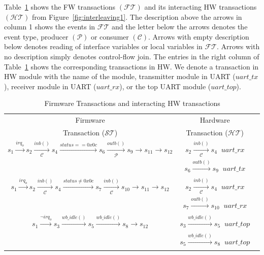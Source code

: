 \documentclass[sigconf]{acmart}
\begin{document}
Table~\ref{transaction} shows the FW transactions $(\mathcal{FT})$ and its 
interacting HW transactions $(\mathcal{HT})$ from Figure~\ref{fig:interleaving1}. 
The description above the arrows 
in column 1 shows the events in $\mathcal{FT}$ and the letter below the
arrows denotes the event type, producer $(\mathcal{P})$ or consumer 
$(\mathcal{C})$. Arrows with empty description below denotes reading of interface
variables or local variables in $\mathcal{FT}$.  Arrows with no description
simply denotes control-flow join.  The entries in the right column of
Table~\ref{transaction} shows the corresponding transactions in HW.  We 
denote a transaction in HW module with the name of the module,
transmitter module in UART ($uart\_tx$), receiver module in UART ($uart\_rx$), or
the top UART module ($uart\_top$).
%
\begin{table}
\begin{center}
{
 \scriptsize
\begin{tabular}{|c|c|c|}
\hline
  Firmware & Hardware  \\
  Transaction ($\mathcal{ST}$) & Transaction ($\mathcal{HT}$) \\ 
\cline{1-2}
   $s_1 \xrightarrow[]{irq_o} s_2 \xrightarrow[\mathcal{C}]{inb()} s_4
   \xrightarrow[]{status == 0x0c} s_6 \xrightarrow[\mathcal{P}]{outb()} s_9 \rightarrow
   s_{11} \rightarrow s_{12}$  & $s_2 \xrightarrow[\mathcal{C}]{inb()} s_4\;\; uart\_{rx}$
   \\ 
   & $s_6 \xrightarrow[]{outb()} s_9\;\; uart\_{tx}$ \\  \hline
   
   $s_1 \xrightarrow[]{irq_o} s_2 \xrightarrow[\mathcal{C}]{inb()} s_4
   \xrightarrow[]{status \neq 0x0c} s_7 \xrightarrow[\mathcal{C}]{inb()} s_{10} \rightarrow
   s_{11} \rightarrow s_{12}$  & $s_2 \xrightarrow[\mathcal{C}]{inb()} s_4\;\; uart\_{rx}$
   \\ 
   & $s_7 \xrightarrow[]{outb()} s_{10}\;\; uart\_{rx}$ \\  \hline
   
   $s_1 \xrightarrow[]{\neg irq_o} s_3 \xrightarrow[]{wb\_{idle()}}
   s_5 \xrightarrow[]{wb\_{idle()}} s_8 \rightarrow
   s_{12}$ & $s_3 \xrightarrow[]{wb\_{idle()}} s_5\;\; uart\_{top}$ \\ 
   & $s_5 \xrightarrow[]{wb\_{idle()}} s_8\;\; uart\_{top}$ \\  \hline
\end{tabular}
}
\end{center}
\caption{\small Firmware Transactions and interacting HW transactions}
\label{transaction}
\end{table}  
%
\end{document}
